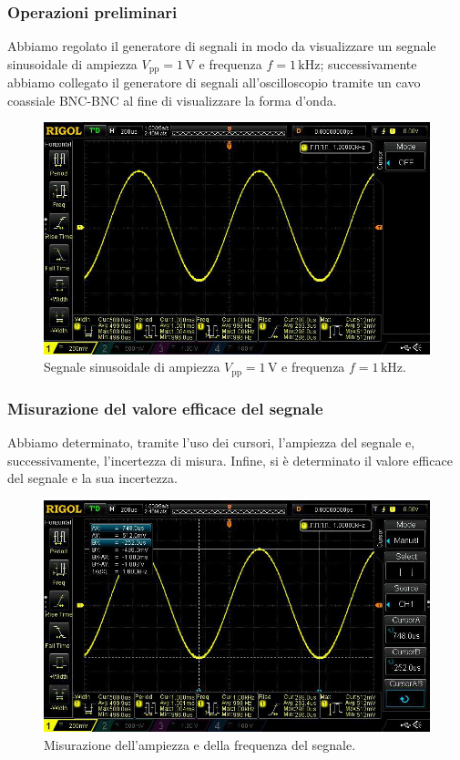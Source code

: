 \documentclass{article}
\begin{document}
			\subsubsection{Operazioni preliminari}
				Abbiamo regolato il generatore di segnali in modo da visualizzare un segnale sinusoidale di ampiezza $ V_{\mathrm{pp}} = 1 \, \mathrm{V} $ e frequenza $ f = 1 \, \mathrm{kHz} $; successivamente abbiamo collegato il generatore di segnali all'oscilloscopio tramite un cavo coassiale BNC-BNC al fine di visualizzare la forma d'onda.
				\begin{figure}[h!]
					\centering
					\includegraphics[scale=0.3]{segnalePuro}
					\caption{Segnale sinusoidale di ampiezza $ V_{\mathrm{pp}} = 1 \, \mathrm{V} $ e frequenza $ f = 1 \, \mathrm{kHz} $.}
					\label{fig:segnalePuro}
				\end{figure}
			\subsubsection{Misurazione del valore efficace del segnale}
				Abbiamo determinato, tramite l'uso dei cursori, l'ampiezza del segnale e, successivamente, l'incertezza di misura. Infine, si è determinato il valore efficace del segnale e la sua incertezza.
				\begin{figure}[h!]
					\centering
					\includegraphics[scale=0.3]{segnaleMisure}
					\caption{Misurazione dell'ampiezza e della frequenza del segnale.}
					\label{fig:segnaleMisure}
				\end{figure}
\end{document}
